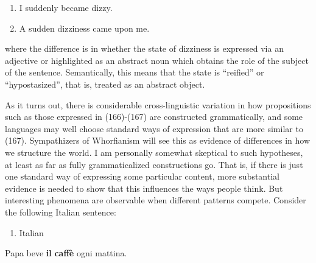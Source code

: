 \begin{enumerate} %
\item 
\label{bkm:Ref107116648}I suddenly became dizzy.

\item 
\label{bkm:Ref107116651}A sudden dizziness came upon me.

\end{enumerate} %
where the difference is in whether the state of dizziness is expressed via an adjective or highlighted as an abstract noun which obtains the role of the subject of the sentence. Semantically, this means that the state is “reified” or “hypostasized”, that is, treated as an abstract object. 

As it turns out, there is considerable cross-linguistic variation in how propositions such as those expressed in (166){}-(167) are constructed grammatically, and some languages may well choose standard ways of expression that are more similar to (167). Sympathizers of Whorfianism will see this as evidence of differences in how we structure the world. I am personally somewhat skeptical to such hypotheses, at least as far as fully grammaticalized constructions go. That is, if there is just one standard way of expressing some particular content, more substantial evidence is needed to show that this influences the ways people think. But interesting phenomena are observable when different patterns compete. Consider the following Italian sentence:

\begin{enumerate} %
\item 
Italian

\end{enumerate} %
\ea\label{}
\gll Papa  beve  \textbf{il} \textbf{caffè} ogni  mattina.\\



